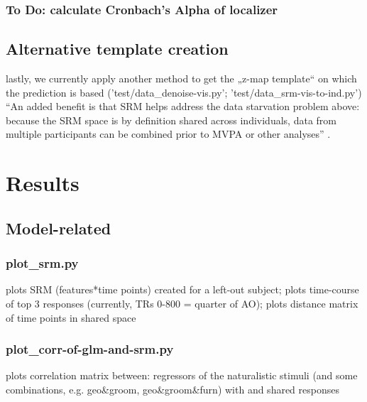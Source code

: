 \subsubsection{To Do: calculate Cronbach's Alpha of localizer}


\subsection{Alternative template creation}
%
lastly, we currently apply another method to get the „z-map template“ on which
the prediction is based ('test/data\_denoise-vis.py';
'test/data\_srm-vis-to-ind.py')
%
``An added benefit is that SRM helps address the data starvation problem above:
because the SRM space is by definition shared across individuals, data from
multiple participants can be combined prior to MVPA or other analyses''
\citep{cohen2017computational}.


\section{Results}



\subsection{Model-related}

\subsubsection{plot\_srm.py}

%
plots SRM (features*time points) created for a left-out subject; plots
time-course of top 3 responses (currently, TRs 0-800 = quarter of AO); plots
distance matrix of time points in shared space

\subsubsection{plot\_corr-of-glm-and-srm.py}

plots correlation matrix between: regressors of the naturalistic stimuli (and
some combinations, e.g. geo\&groom, geo\&groom\&furn) with and shared responses

